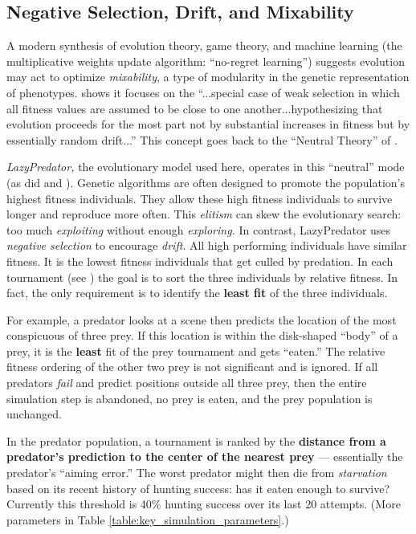 \documentclass[letterpaper]{article}
\newcommand{\jargon}[1]{\textit{#1}}
\newcommand{\lazypredator}[0]{LazyPredator}
\begin{document}
\subsection{Negative Selection, Drift, and Mixability}

A modern synthesis \citep{livnat_sex_2016} of evolution theory, game theory, and machine learning (the multiplicative weights update algorithm: “no-regret learning”) suggests evolution may act to optimize \jargon{mixability}, a type of modularity in the genetic representation of phenotypes. \citet{chastain_multiplicative_2013} shows it focuses on the “...special case of weak selection in which all fitness values are assumed to be close to one another...hypothesizing that evolution proceeds for the most part not by substantial increases in fitness but by essentially random drift...” This concept goes back to the “Neutral Theory” of \citet{kimura_evolutionary_1968}.
\par
\jargon{\lazypredator{},} the evolutionary model used here, operates in this “neutral” mode (as did \citet{reynolds_iec_2011} and \citet{harrington_coevolution_2014}). Genetic algorithms are often designed to promote the population's highest fitness individuals. They allow these high fitness individuals to survive longer and reproduce more often. This \jargon{elitism} can skew the evolutionary search: too much \jargon{exploiting} without enough \jargon{exploring.}  In contrast, \lazypredator{} uses \textit{negative selection} to encourage \jargon{drift}. All high performing individuals have similar fitness. It is the lowest fitness individuals that get culled by predation. In each tournament (see ) the goal is to sort the three individuals by relative fitness. In fact, the only requirement is to identify the \textbf{least fit} of the three individuals.
\par 
For example, a predator looks at a scene then predicts the location of the most conspicuous of three prey. If this location is within the disk-shaped “body” of a prey, it is the \textbf{least} fit of the prey tournament and gets “eaten.” The relative fitness ordering of the other two prey is not significant and is ignored. If all predators \jargon{fail} and predict positions outside all three prey, then the entire simulation step is abandoned, no prey is eaten, and the prey population is unchanged.
\par
In the predator population, a tournament is ranked by the \textbf{distance from a predator's prediction to the center of the nearest prey} — essentially the predator's “aiming error.” The worst predator might then die from \jargon{starvation} based on its recent history of hunting success: has it eaten enough to survive? Currently this threshold is 40\% hunting success over its last 20 attempts. (More parameters in Table \ref{table:key_simulation_parameters}.)
\end{document}

